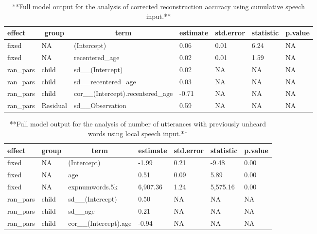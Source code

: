 \documentclass[man,mask,floatsintext]{apa6}
\begin{document}
\begin{table}[tbp]
\begin{center}
\begin{threeparttable}
\caption{\label{tab:tab-corr_reconstr_acc-cumu-MAIN}**Full model output for the analysis of corrected reconstruction accuracy using cumulative speech input.**}
\begin{tabular}{lllllll}
\toprule
effect & \multicolumn{1}{c}{group} & \multicolumn{1}{c}{term} & \multicolumn{1}{c}{estimate} & \multicolumn{1}{c}{std.error} & \multicolumn{1}{c}{statistic} & \multicolumn{1}{c}{p.value}\\
\midrule
fixed & NA & (Intercept) & 0.06 & 0.01 & 6.24 & NA\\
fixed & NA & recentered\_age & 0.02 & 0.01 & 1.59 & NA\\
ran\_pars & child & sd\_\_(Intercept) & 0.02 & NA & NA & NA\\
ran\_pars & child & sd\_\_recentered\_age & 0.03 & NA & NA & NA\\
ran\_pars & child & cor\_\_(Intercept).recentered\_age & -0.71 & NA & NA & NA\\
ran\_pars & Residual & sd\_\_Observation & 0.59 & NA & NA & NA\\
\bottomrule
\end{tabular}
\end{threeparttable}
\end{center}
\end{table}

\begin{table}[tbp]
\begin{center}
\begin{threeparttable}
\caption{\label{tab:tab-unseen_words-local-MAIN}**Full model output for the analysis of number of utterances with previously unheard words using local speech input.**}
\begin{tabular}{lllllll}
\toprule
effect & \multicolumn{1}{c}{group} & \multicolumn{1}{c}{term} & \multicolumn{1}{c}{estimate} & \multicolumn{1}{c}{std.error} & \multicolumn{1}{c}{statistic} & \multicolumn{1}{c}{p.value}\\
\midrule
fixed & NA & (Intercept) & -1.99 & 0.21 & -9.48 & 0.00\\
fixed & NA & age & 0.51 & 0.09 & 5.89 & 0.00\\
fixed & NA & expnumwords.5k & 6,907.36 & 1.24 & 5,575.16 & 0.00\\
ran\_pars & child & sd\_\_(Intercept) & 0.50 & NA & NA & NA\\
ran\_pars & child & sd\_\_age & 0.21 & NA & NA & NA\\
ran\_pars & child & cor\_\_(Intercept).age & -0.94 & NA & NA & NA\\
\bottomrule
\end{tabular}
\end{threeparttable}
\end{center}
\end{table}
\end{document}
